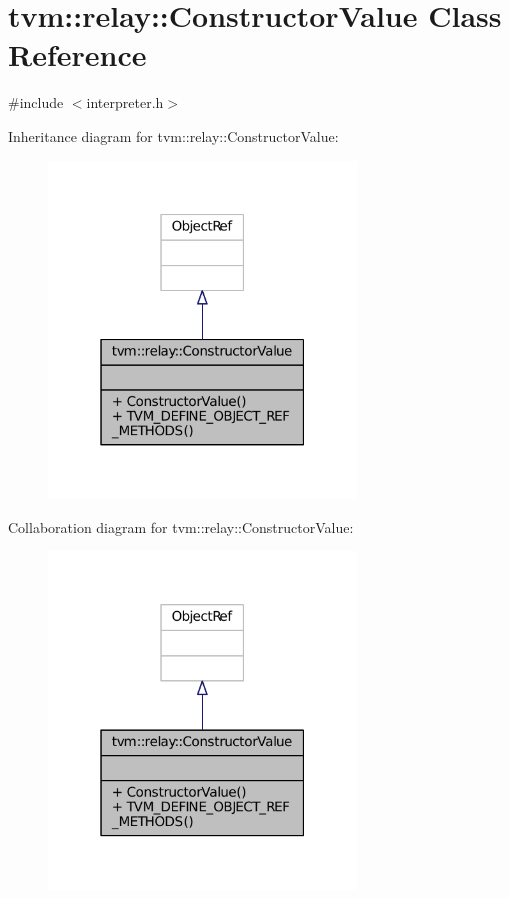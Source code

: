 \hypertarget{classtvm_1_1relay_1_1ConstructorValue}{}\section{tvm\+:\+:relay\+:\+:Constructor\+Value Class Reference}
\label{classtvm_1_1relay_1_1ConstructorValue}


{\ttfamily \#include $<$interpreter.\+h$>$}



Inheritance diagram for tvm\+:\+:relay\+:\+:Constructor\+Value\+:
\nopagebreak
\begin{figure}[H]
\begin{center}
\leavevmode
\includegraphics[width=232pt]{classtvm_1_1relay_1_1ConstructorValue__inherit__graph}
\end{center}
\end{figure}


Collaboration diagram for tvm\+:\+:relay\+:\+:Constructor\+Value\+:
\nopagebreak
\begin{figure}[H]
\begin{center}
\leavevmode
\includegraphics[width=232pt]{classtvm_1_1relay_1_1ConstructorValue__coll__graph}
\end{center}
\end{figure}
